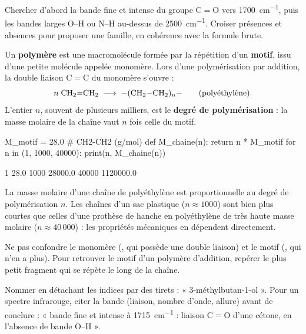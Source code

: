 \begin{savoirfaire}
Chercher d'abord la bande fine et intense du groupe C$=$O vers \qty{1700}{cm^{-1}}, puis les bandes larges O--H ou
N--H au-dessus de \qty{2500}{cm^{-1}}. Croiser présences et absences pour proposer une famille, en cohérence avec la
formule brute.
\end{savoirfaire}
\begin{definition}
Un \textbf{polymère} est une macromolécule formée par la répétition d'un \textbf{motif}, issu d'une petite molécule
appelée monomère. Lors d'une polymérisation par addition, la double liaison C$=$C du monomère s'ouvre :
\[n\;\ce{CH2=CH2}\;\longrightarrow\;\ce{-(CH2-CH2)_{$n$}-}\qquad\text{(polyéthylène)}.\]
L'entier $n$, souvent de plusieurs milliers, est le \textbf{degré de polymérisation} : la masse molaire de la chaîne
vaut $n$ fois celle du motif.
\end{definition}
\begin{codecote}[0.56]
\begin{pythoncol}
M_motif = 28.0   # CH2-CH2 (g/mol)
def M_chaine(n):
    return n * M_motif
for n in (1, 1000, 40000):
    print(n, M_chaine(n))
\end{pythoncol}
\begin{consolecol}
1 28.0
1000 28000.0
40000 1120000.0
\end{consolecol}
\cote
\fontsize{9.5}{12.5}\selectfont
{}\par\smallskip
La masse molaire d'une chaîne de polyéthylène est proportionnelle au degré de polymérisation $n$. Les chaînes d'un
sac plastique ($n\approx1000$) sont bien plus courtes que celles d'une prothèse de hanche en polyéthylène de très
haute masse molaire ($n\approx40\,000$) : les propriétés mécaniques en dépendent directement.
\end{codecote}
\begin{attention}
Ne pas confondre le monomère (, qui possède une double liaison) et le motif (, qui n'en a
plus). Pour retrouver le motif d'un polymère d'addition, repérer le plus petit fragment qui se répète le long de la
chaîne.
\end{attention}
\begin{rediger}
Nommer en détachant les indices par des tirets : « 3-méthylbutan-1-ol ». Pour un spectre infrarouge, citer la bande
(liaison, nombre d'onde, allure) avant de conclure : « bande fine et intense à \qty{1715}{cm^{-1}} : liaison C$=$O d'une
cétone, en l'absence de bande O--H ».
\end{rediger}
\exercices

